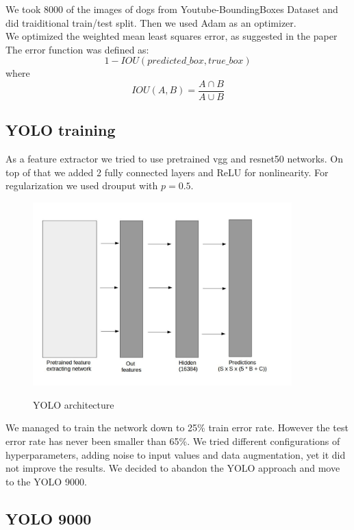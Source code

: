 \documentclass{article}
\begin{document}
We took 8000 of the images of dogs from Youtube-BoundingBoxes Dataset and did traiditional train/test split. Then we used Adam as an optimizer. \\

We optimized the weighted mean least squares error, as suggested in the paper \cite{yolo} \\

The error function was defined as:
$$ 1 - IOU(predicted\_box, true\_box)$$
where
$$ IOU(A, B) = \frac{ A \cap B}{A \cup B} $$

\subsection*{YOLO training}
As a feature extractor we tried to use pretrained vgg and resnet50 networks. On top of that we added 2 fully connected layers and ReLU for nonlinearity. For regularization we used drouput with $p = 0.5$. 

\begin{figure}[H]
	\begin{center}
		\includegraphics[width=10cm]{yolo_arch.jpg}\\
		\centering
		\caption{YOLO architecture}
	\end{center}
\hfill

\end{figure}

We managed to train the network down to 25\% train error rate. However the test error rate has never been smaller than 65\%. We tried different configurations of hyperparameters, adding noise to input values and data augmentation, yet it did not improve the results. We decided to abandon the YOLO approach and move to the YOLO 9000.

\subsection*{YOLO 9000}
\end{document}
